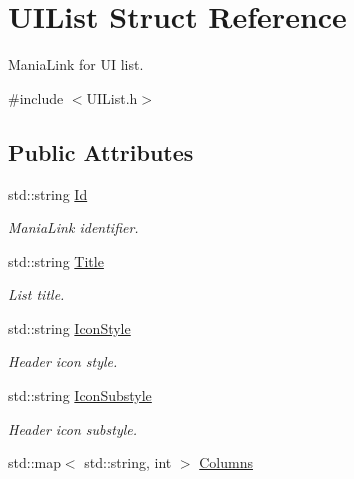 \hypertarget{structUIList}{\section{U\-I\-List Struct Reference}
\label{structUIList}
}


Mania\-Link for U\-I list.  




{\ttfamily \#include $<$U\-I\-List.\-h$>$}

\subsection*{Public Attributes}
\begin{DoxyCompactItemize}
\item 
\hypertarget{structUIList_ae551552dcaae820fe1cc6413c61c8ecc}{std\-::string \hyperlink{structUIList_ae551552dcaae820fe1cc6413c61c8ecc}{Id}}\label{structUIList_ae551552dcaae820fe1cc6413c61c8ecc}

\begin{DoxyCompactList}\small\item\em Mania\-Link identifier. \end{DoxyCompactList}\item 
\hypertarget{structUIList_a653f1be5fe8e835df46a7068c49ff75e}{std\-::string \hyperlink{structUIList_a653f1be5fe8e835df46a7068c49ff75e}{Title}}\label{structUIList_a653f1be5fe8e835df46a7068c49ff75e}

\begin{DoxyCompactList}\small\item\em List title. \end{DoxyCompactList}\item 
\hypertarget{structUIList_a43200f878fb7b0d3575e3ae9181f8dab}{std\-::string \hyperlink{structUIList_a43200f878fb7b0d3575e3ae9181f8dab}{Icon\-Style}}\label{structUIList_a43200f878fb7b0d3575e3ae9181f8dab}

\begin{DoxyCompactList}\small\item\em Header icon style. \end{DoxyCompactList}\item 
\hypertarget{structUIList_aa12ecc6bec2a12f1aa3bf9ffba33aa3c}{std\-::string \hyperlink{structUIList_aa12ecc6bec2a12f1aa3bf9ffba33aa3c}{Icon\-Substyle}}\label{structUIList_aa12ecc6bec2a12f1aa3bf9ffba33aa3c}

\begin{DoxyCompactList}\small\item\em Header icon substyle. \end{DoxyCompactList}\item 
\hypertarget{structUIList_a0ae21ef9cca29d0b9b98227520e24ab6}{std\-::map$<$ std\-::string, int $>$ \hyperlink{structUIList_a0ae21ef9cca29d0b9b98227520e24ab6}{Columns}}\label{structUIList_a0ae21ef9cca29d0b9b98227520e24ab6}


\end{DoxyCompactItemize}
